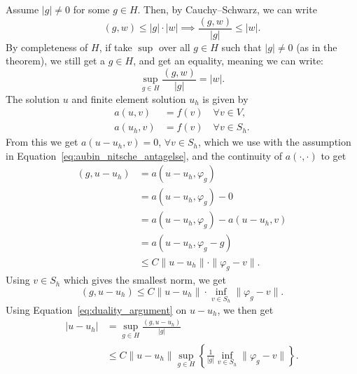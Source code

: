 \begin{bev}
    Assume $|g|\neq 0$ for some $g\in H$. Then,
    by Cauchy–Schwarz, we can write 
    \begin{equation*}
        (g,w) \leq |g| \cdot |w| \implies \frac{(g,w)}{|g|} \leq |w|.
    \end{equation*}
    By completeness of $H$, if take $\sup$ over all $g\in H$ such that 
    $|g|\neq 0$ (as in the theorem), we still get a $g\in H$, and get 
    an equality, meaning we can write:
    \begin{equation}
        \sup_{g\in H} \frac{(g,w)}{|g|} = |w|. \label{eq:duality_argument}
    \end{equation}
    The solution $u$ and finite element solution $u_h$ is given by 
    \begin{align*}
        a(u,v) &= f(v) \quad \forall v \in V, \\
        a(u_h,v) &= f(v) \quad \forall v \in S_h.
    \end{align*}
    From this we get $a(u-u_h,v)=0$, $\forall v\in S_h$, which we use with the assumption in 
    Equation~\ref{eq:aubin_nitsche_antagelse}, and the continuity of $a(\cdot,\cdot)$ to get
    \begin{align*}
        (g,u-u_h) &= a(u-u_h,\varphi _g) \\
                  &= a(u-u_h,\varphi _g) -0 \\
                  &=a(u-u_h,\varphi _g) -a(u-u_h,v) \\
                  &=a(u-u_h, \varphi_g -g) \\
                  &\leq C \|u-u_h\| \cdot \|\varphi_g-v\|.
    \end{align*}
    Using $v\in S_h$ which gives the smallest norm, we get 
    \begin{equation*}
        (g,u-u_h) \leq C \|u-u_h\| \cdot \inf_{v\in S_h} \|\varphi_g-v\|.
    \end{equation*}
    Using Equation~\ref{eq:duality_argument} on $u-u_h$, we then get 
    \begin{align*}
        |u-u_h| &= \sup_{g\in H} \frac{(g,u-u_h)}{|g|} \\
        &\leq C \| u-u_h\| \sup_{g\in H} \left \{ \frac{1}{|g|} \inf_{v \in S_h} \|\varphi_g - v\| \right \}.
    \end{align*}
\end{bev}
